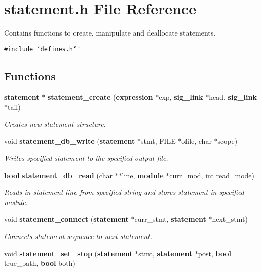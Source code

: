 \section{statement.h File Reference}
\label{statement_8h}
Contains functions to create, manipulate and deallocate statements.  


{\tt \#include \char`\"{}defines.h\char`\"{}}\par
\subsection*{Functions}
\begin{CompactItemize}
\item 
{\bf statement} $\ast$ {\bf statement\_\-create} ({\bf expression} $\ast$exp, {\bf sig\_\-link} $\ast$head, {\bf sig\_\-link} $\ast$tail)
\begin{CompactList}\small\item\em Creates new statement structure. \item\end{CompactList}\item 
void {\bf statement\_\-db\_\-write} ({\bf statement} $\ast$stmt, FILE $\ast$ofile, char $\ast$scope)
\begin{CompactList}\small\item\em Writes specified statement to the specified output file. \item\end{CompactList}\item 
{\bf bool} {\bf statement\_\-db\_\-read} (char $\ast$$\ast$line, {\bf module} $\ast$curr\_\-mod, int read\_\-mode)
\begin{CompactList}\small\item\em Reads in statement line from specified string and stores statement in specified module. \item\end{CompactList}\item 
void {\bf statement\_\-connect} ({\bf statement} $\ast$curr\_\-stmt, {\bf statement} $\ast$next\_\-stmt)
\begin{CompactList}\small\item\em Connects statement sequence to next statement. \item\end{CompactList}\item 
void {\bf statement\_\-set\_\-stop} ({\bf statement} $\ast$stmt, {\bf statement} $\ast$post, {\bf bool} true\_\-path, {\bf bool} both)
$$
\end{CompactItemize}
